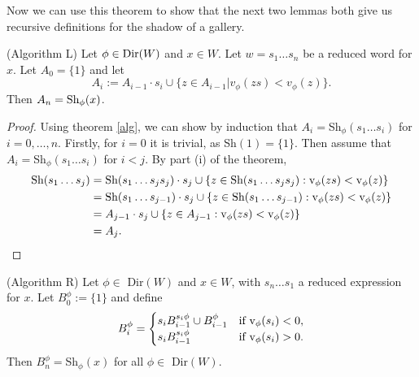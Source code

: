 \documentclass[11pt]{article}
\begin{document}

Now we can use this theorem to show that the next two lemmas both give us recursive definitions for the shadow of a gallery. 

\begin{lemma} (Algorithm L)
    Let $\phi\in\textnormal{Dir}(W)$ and $x\in W$. Let $w=s_1\hdots s_n$ be a reduced word for $x$. Let $A_0=\{1\}$ and let
    \[A_i:=A_{i-1}\cdot s_i\cup \{z\in A_{i-1}|v_\phi(zs)<v_\phi(z)\}.\]
    Then $A_n=\textnormal{Sh}_\phi(x)$. 
\end{lemma}

\begin{proof}
    Using theorem \ref{alg}, we can show by induction that $A_i=$Sh$_\phi(s_1\hdots s_i)$ for $i=0,\hdots ,n$. Firstly, for $i=0$ it is trivial, as Sh$(1)=\{1\}$. Then assume that $A_i=$Sh$_\phi(s_1\hdots s_i)$ for $i<j$. By part (i) of the theorem,\[\begin{aligned}
    \textnormal{Sh}(s_1\hdots s_j)& = \textnormal{Sh}(s_1\hdots s_js_j)\cdot s_j \cup \{z\in \textnormal{Sh}(s_1\hdots s_js_j): \textnormal{v}_\phi(zs)<\textnormal{v}_\phi(z)\}\\
        & = \textnormal{Sh}(s_1\hdots s_{j-1})\cdot s_j \cup \{z\in \textnormal{Sh}(s_1\hdots s_{j-1}): \textnormal{v}_\phi(zs)<\textnormal{v}_\phi(z)\}\\
        & = A_{j-1}\cdot s_j \cup \{z\in A_{j-1}: \textnormal{v}_\phi(zs)<\textnormal{v}_\phi(z)\}\\
        & = A_j.
    \end{aligned}\]
\end{proof}

\begin{lemma} (Algorithm R)
    Let $\phi\in$ Dir$(W)$ and $x\in W$, with $s_n\hdots s_1$ a reduced expression for $x$. Let $B_0^\phi:=\{1\}$ and define
    \[B_i^\phi = \begin{cases}
        s_iB_{i-1}^{s_i\phi}\cup B_{i-1}^\phi & \textnormal{if v}_\phi(s_i)<0,\\
        s_iB_{i-1}^{s_i\phi} & \textnormal{if v}_\phi(s_i)>0.
    \end{cases}\]
    Then $B^\phi_n=$Sh$_\phi(x)$ for all $\phi\in$ Dir$(W)$. 
\end{lemma}
\end{document}
